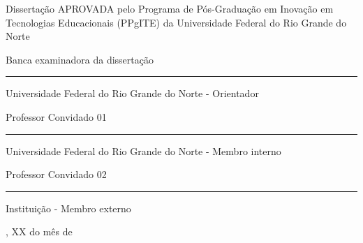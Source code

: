 \vspace{2.0cm}
\begin{center}
{\Large \textsc{\imprimirtitulo}}
\end{center}
\vspace{1.5cm}
\begin{center}
{\large \textsc{\imprimirautor}}
\end{center}
\vspace{1.0cm}
\begin{center}
{\Large Dissertação APROVADA pelo Programa de Pós-Graduação em Inovação em Tecnologias Educacionais (PPgITE) da Universidade Federal do Rio Grande do Norte}
\end{center}
\vspace{1.0mm}

\begin{flushleft}
{\large Banca examinadora da dissertação}

\vspace{0.5cm}

{\large\imprimirorientador} \hspace{2cm} \rule{5cm}{0.4pt}

\vspace{-0.5cm}

{\footnotesize Universidade Federal do Rio Grande do Norte - Orientador}

\vspace{0.5cm}

{\large Professor Convidado 01} \hspace{5cm} \rule{5cm}{0.4pt}

\vspace{-0.5cm}

{\footnotesize Universidade Federal do Rio Grande do Norte - Membro interno}

\vspace{0.5cm}

{\large Professor Convidado 02} \hspace{5cm} \rule{5cm}{0.4pt}

\vspace{-0.5cm}

{\footnotesize Instituição - Membro externo}


\end{flushleft}

\vspace{6cm}

\begin{center}
{\Large\imprimirlocal}, {\Large XX do mês de \imprimirdata}
\end{center}

\newpage